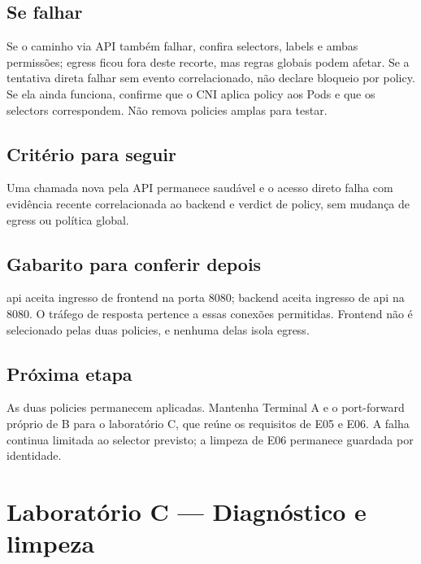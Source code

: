 \documentclass[12pt,openany,oneside,a4paper,chapter=TITLE,english,brazil]{abntex2}
\begin{document}
\section*{Se falhar}\label{se-falhar-3}

Se o caminho via API também falhar, confira selectors, labels e ambas permissões; egress ficou fora deste recorte, mas regras globais podem afetar. Se a tentativa direta falhar sem evento correlacionado, não declare bloqueio por policy. Se ela ainda funciona, confirme que o CNI aplica policy aos Pods e que os selectors correspondem. Não remova policies amplas para testar.

\section*{Critério para seguir}\label{crituxe9rio-para-seguir-3}

Uma chamada nova pela API permanece saudável e o acesso direto falha com evidência recente correlacionada ao backend e verdict de policy, sem mudança de egress ou política global.

\section*{Gabarito para conferir depois}\label{gabarito-para-conferir-depois-3}

api aceita ingresso de frontend na porta 8080; backend aceita ingresso de api na 8080. O tráfego de resposta pertence a essas conexões permitidas. Frontend não é selecionado pelas duas policies, e nenhuma delas isola egress.

\section*{Próxima etapa}\label{pruxf3xima-etapa-2}

As duas policies permanecem aplicadas. Mantenha Terminal A e o port-forward próprio de B para o laboratório C, que reúne os requisitos de E05 e E06. A falha continua limitada ao selector previsto; a limpeza de E06 permanece guardada por identidade.

\chapter*{Laboratório C — Diagnóstico e limpeza}
\end{document}
